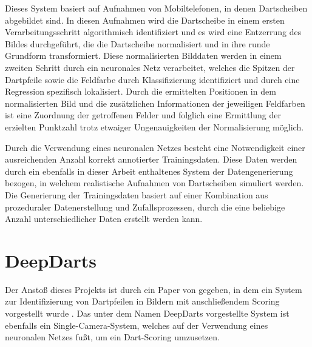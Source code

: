 Dieses System basiert auf Aufnahmen von Mobiltelefonen, in denen Dartscheiben abgebildet sind. In diesen Aufnahmen wird die Dartscheibe in einem ersten Verarbeitungsschritt algorithmisch identifiziert und es wird eine Entzerrung des Bildes durchgeführt, die die Dartscheibe normalisiert und in ihre runde Grundform transformiert. Diese normalisierten Bilddaten werden in einem zweiten Schritt durch ein neuronales Netz verarbeitet, welches die Spitzen der Dartpfeile sowie die Feldfarbe durch Klassifizierung identifiziert und durch eine Regression spezifisch lokalisiert. Durch die ermittelten Positionen in dem normalisierten Bild und die zusätzlichen Informationen der jeweiligen Feldfarben ist eine Zuordnung der getroffenen Felder und folglich eine Ermittlung der erzielten Punktzahl trotz etwaiger Ungenauigkeiten der Normalisierung möglich.

Durch die Verwendung eines neuronalen Netzes besteht eine Notwendigkeit einer ausreichenden Anzahl korrekt annotierter Trainingsdaten. Diese Daten werden durch ein ebenfalls in dieser Arbeit enthaltenes System der Datengenerierung bezogen, in welchem realistische Aufnahmen von Dartscheiben simuliert werden. Die Generierung der Trainingsdaten basiert auf einer Kombination aus prozeduraler Datenerstellung und Zufallsprozessen, durch die eine beliebige Anzahl unterschiedlicher Daten erstellt werden kann.



\section{DeepDarts}
\label{sec:deepdarts}

Der Anstoß dieses Projekts ist durch ein Paper von \citeauthor{deepdarts} gegeben, in dem ein System zur Identifizierung von Dartpfeilen in Bildern mit anschließendem Scoring vorgestellt wurde \cite{deepdarts}. Das unter dem Namen DeepDarts vorgestellte System ist ebenfalls ein Single-Camera-System, welches auf der Verwendung eines neuronalen Netzes fußt, um ein Dart-Scoring umzusetzen.

